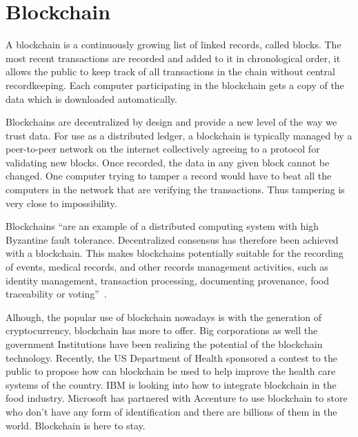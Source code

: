 \section{Blockchain}

A blockchain is a continuously growing list of linked records, called
blocks. The most recent transactions are recorded and added to it in
chronological order, it allows the public to keep track of all
transactions in the chain without central recordkeeping. Each computer
participating in the blockchain gets a copy of the data which is
downloaded automatically.

Blockchains are decentralized by design and provide a new level of the
way we trust data. For use as a distributed ledger, a blockchain is
typically managed by a peer-to-peer network on the internet
collectively agreeing to a protocol for validating new blocks. Once
recorded, the data in any given block cannot be changed. One computer
trying to tamper a record would have to beat all the computers in the
network that are verifying the transactions. Thus tampering is very
close to impossibility.

Blockchains ``are an example of a distributed computing system with
high Byzantine fault tolerance.  Decentralized consensus has therefore
been achieved with a blockchain.  This makes blockchains potentially
suitable for the recording of events, medical records, and other
records management activities, such as identity management,
transaction processing, documenting provenance, food traceability or
voting''~\cite{hid-sp18-506-Blockchain}.

Alhough, the popular use of blockchain nowadays is with the generation
of cryptocurrency, blockchain has more to offer. Big corporations as
well the government Institutions have been realizing the potential of
the blockchain technology. Recently, the US Department of Health
sponsored a contest to the public to propose how can blockchain be
used to help improve the health care systems of the country.  IBM is
looking into how to integrate blockchain in the food
industry. Microsoft has partnered with Accenture to use blockchain to
store who don't have any form of identification and there are billions
of them in the world. Blockchain is here to stay.

